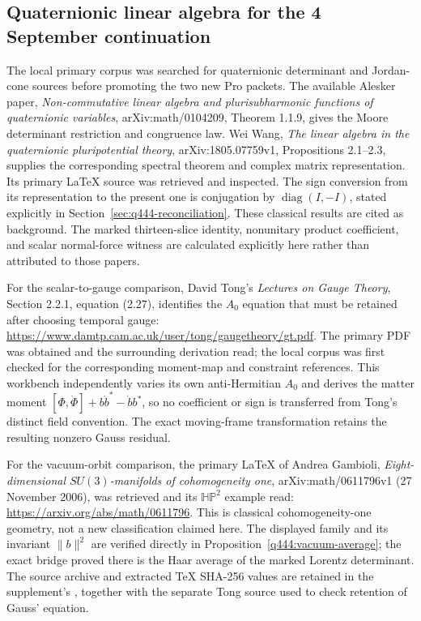 \subsection*{Quaternionic linear algebra for the 4 September continuation}
The local primary corpus was searched for quaternionic determinant and
Jordan-cone sources before promoting the two new Pro packets. The available
Alesker paper, \emph{Non-commutative linear algebra and plurisubharmonic
functions of quaternionic variables}, arXiv:math/0104209, Theorem 1.1.9,
gives the Moore determinant restriction and congruence law.
Wei Wang, \emph{The linear algebra in the quaternionic pluripotential theory},
arXiv:1805.07759v1, Propositions 2.1--2.3, supplies the corresponding
spectral theorem and complex matrix representation. Its primary LaTeX
source was retrieved and inspected. The sign conversion from its
representation to the present one is conjugation by
$\operatorname{diag}(I,-I)$, stated explicitly in
Section~\ref{sec:q444-reconciliation}.
These classical results are cited as background. The marked thirteen-slice
identity, nonunitary product coefficient, and scalar normal-force witness
are calculated explicitly here rather than attributed to those papers.

For the scalar-to-gauge comparison, David Tong's \emph{Lectures on Gauge
Theory}, Section 2.2.1, equation (2.27), identifies the $A_0$ equation
that must be retained after choosing temporal gauge:
\url{https://www.damtp.cam.ac.uk/user/tong/gaugetheory/gt.pdf}.
The primary PDF was obtained and the surrounding derivation read; the
local corpus was first checked for the corresponding moment-map and
constraint references. This workbench independently varies its own
anti-Hermitian $A_0$ and derives the matter moment
$[\Phi,\dot\Phi]+b\dot b^*-\dot b b^*$, so no coefficient or sign is
transferred from Tong's distinct field convention. The exact moving-frame
transformation retains the resulting nonzero Gauss residual.

For the vacuum-orbit comparison, the primary LaTeX of Andrea Gambioli,
\emph{Eight-dimensional $SU(3)$-manifolds of cohomogeneity one},
arXiv:math/0611796v1 (27 November 2006), was retrieved and its
$\mathbb{HP}^2$ example read:
\url{https://arxiv.org/abs/math/0611796}.
This is classical cohomogeneity-one geometry, not a new classification
claimed here. The displayed family and its invariant $\|b\|^2$ are
verified directly in Proposition~\ref{q444:vacuum-average}; the exact
bridge proved there is the Haar average of the marked Lorentz determinant.
The source archive and extracted TeX SHA-256 values are retained in the
supplement's , together with the
separate Tong source used to check retention of Gauss' equation.

